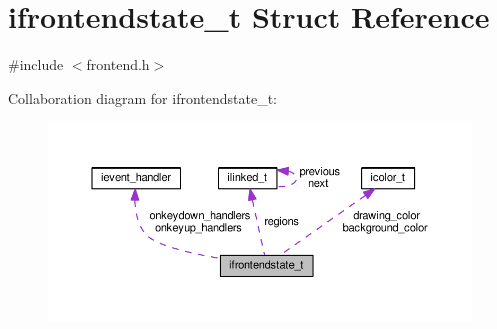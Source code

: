 \hypertarget{structifrontendstate__t}{\section{ifrontendstate\-\_\-t Struct Reference}
\label{structifrontendstate__t}
}


{\ttfamily \#include $<$frontend.\-h$>$}



Collaboration diagram for ifrontendstate\-\_\-t\-:\nopagebreak
\begin{figure}[H]
\begin{center}
\leavevmode
\includegraphics[width=350pt]{structifrontendstate__t__coll__graph}
\end{center}
\end{figure}
